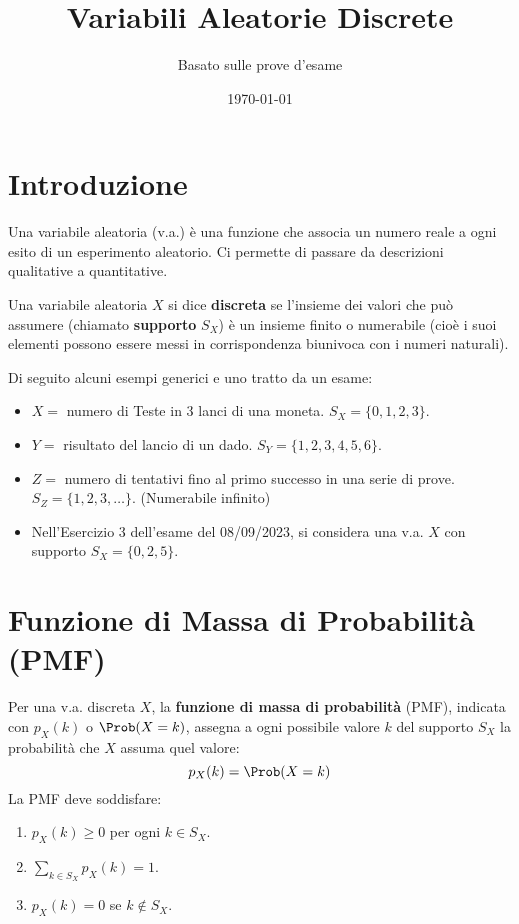 

\title{Variabili Aleatorie Discrete}
\author{Basato sulle prove d'esame}
\date{\today}



\maketitle
\tableofcontents
\newpage

\section{Introduzione}

\label{cap:va_discrete}
Una variabile aleatoria (v.a.) è una funzione che associa un numero reale a ogni esito di un esperimento aleatorio. Ci permette di passare da descrizioni qualitative a quantitative.

\begin{definition}
Una variabile aleatoria $X$ si dice \textbf{discreta} se l'insieme dei valori che può assumere (chiamato \textbf{supporto} $S_X$) è un insieme finito o numerabile (cioè i suoi elementi possono essere messi in corrispondenza biunivoca con i numeri naturali).
\end{definition}

Di seguito alcuni esempi generici e uno tratto da un esame:
\begin{itemize}
    \item $X = $ numero di Teste in 3 lanci di una moneta. $S_X = \{0, 1, 2, 3\}$.
    \item $Y = $ risultato del lancio di un dado. $S_Y = \{1, 2, 3, 4, 5, 6\}$.
    \item $Z = $ numero di tentativi fino al primo successo in una serie di prove. $S_Z = \{1, 2, 3, \dots\}$. (Numerabile infinito)
    \item Nell'Esercizio 3 dell'esame del 08/09/2023, si considera una v.a. $X$ con supporto $S_X = \{0, 2, 5\}$.
\end{itemize}

\section{Funzione di Massa di Probabilità (PMF)}
\begin{definition}
Per una v.a. discreta $X$, la \textbf{funzione di massa di probabilità} (PMF), indicata con $p_X(k)$ o $\Prob(X=k)$, assegna a ogni possibile valore $k$ del supporto $S_X$ la probabilità che $X$ assuma quel valore:
\[ p_X(k) = \Prob(X=k) \]
La PMF deve soddisfare:
\begin{enumerate}
    \item $p_X(k) \ge 0$ per ogni $k \in S_X$.
    \item $\sum_{k \in S_X} p_X(k) = 1$.
    \item $p_X(k) = 0$ se $k \notin S_X$.
\end{enumerate}
\end{definition}

